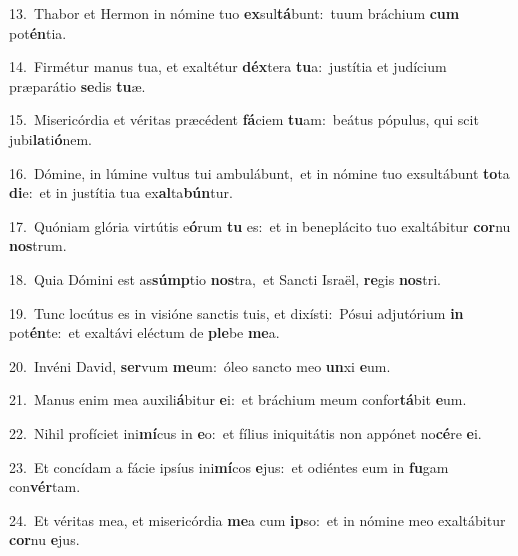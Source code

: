 {\numbfont\textcolor{\numbcolor}{13.}}~Thabor et Hermon in nómine tuo \textbf{ex}\-sul\-\textbf{tá}\-bunt:~\star tuum bráchium \textbf{cum} pot\-\textbf{én}\-tia.\par
{\numbfont\textcolor{\numbcolor}{14.}}~Firmétur manus tua, et exaltétur \textbf{déx}\-tera \textbf{tu}\-a:~\star justítia et judícium præparátio \textbf{se}\-dis \textbf{tu}\-æ.\par
{\numbfont\textcolor{\numbcolor}{15.}}~Misericórdia et véritas præcédent \textbf{fá}\-ciem \textbf{tu}\-am:~\star beátus pópulus, qui scit jubi\-\textbf{la}\-ti\-\textbf{ó}\-nem.\par
{\numbfont\textcolor{\numbcolor}{16.}}~Dómine, in lúmine vultus tui ambulábunt,~\dagger et in nómine tuo exsultábunt \textbf{to}\-ta \textbf{di}\-e:~\star et in justítia tua ex\-\textbf{al}\-ta\-\textbf{bún}\-tur.\par
{\numbfont\textcolor{\numbcolor}{17.}}~Quóniam glória virtútis e\-\textbf{ó}\-rum \textbf{tu} es:~\star et in beneplácito tuo exaltábitur \textbf{cor}\-nu \textbf{nos}\-trum.\par
{\numbfont\textcolor{\numbcolor}{18.}}~Quia Dómini est as\-\textbf{súmp}\-tio \textbf{nos}\-tra,~\star et Sancti Israël, \textbf{re}\-gis \textbf{nos}\-tri.\par
{\numbfont\textcolor{\numbcolor}{19.}}~Tunc locútus es in visióne sanctis tuis, et dixísti:~\dagger Pósui adjutórium \textbf{in} pot\-\textbf{én}\-te:~\star et exaltávi eléctum de \textbf{ple}\-be \textbf{me}\-a.\par
{\numbfont\textcolor{\numbcolor}{20.}}~Invéni David, \textbf{ser}\-vum \textbf{me}\-um:~\star óleo sancto meo \textbf{un}\-xi \textbf{e}\-um.\par
{\numbfont\textcolor{\numbcolor}{21.}}~Manus enim mea auxili\-\textbf{á}\-bitur \textbf{e}\-i:~\star et bráchium meum confor\-\textbf{tá}\-bit \textbf{e}\-um.\par
{\numbfont\textcolor{\numbcolor}{22.}}~Nihil profíciet ini\-\textbf{mí}\-cus in \textbf{e}\-o:~\star et fílius iniquitátis non appónet no\-\textbf{cé}\-re \textbf{e}\-i.\par
{\numbfont\textcolor{\numbcolor}{23.}}~Et concídam a fácie ipsíus ini\-\textbf{mí}\-cos \textbf{e}\-jus:~\star et odiéntes eum in \textbf{fu}\-gam con\-\textbf{vér}\-tam.\par
{\numbfont\textcolor{\numbcolor}{24.}}~Et véritas mea, et misericórdia \textbf{me}\-a cum \textbf{ip}\-so:~\star et in nómine meo exaltábitur \textbf{cor}\-nu \textbf{e}\-jus.\par
